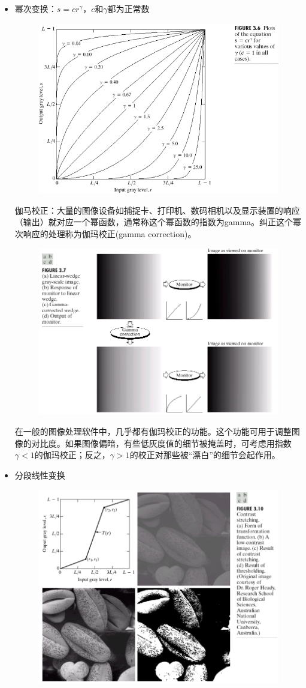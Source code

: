 \begin{itemize}
\begin{figure}[H]
\end{figure}
\item 幂次变换：$s=cr^\gamma$，$c$和$\gamma$都为正常数
\begin{figure}[H]
\centering
\includegraphics[width=0.6\linewidth]{fig/trans-power.png}
\end{figure}
伽马校正：大量的图像设备如捕捉卡、打印机、数码相机以及显示装置的响应（输出）就对应一个幂函数，通常称这个幂函数的指数为gamma。纠正这个幂次响应的处理称为伽玛校正(gamma correction)。
\begin{figure}[H]
\centering
\includegraphics[width=0.6\linewidth]{fig/trans-gamma.png}
\end{figure}
在一般的图像处理软件中，几乎都有伽玛校正的功能。这个功能可用于调整图像的对比度。如果图像偏暗，有些低灰度值的细节被掩盖时，可考虑用指数$\gamma<1$的伽玛校正；反之，$\gamma>1$的校正对那些被“漂白”的细节会起作用。
\item 分段线性变换
\begin{figure}[H]
\centering
\includegraphics[width=0.6\linewidth]{fig/trans-by-cases.png}

\end{figure}
\end{itemize}
